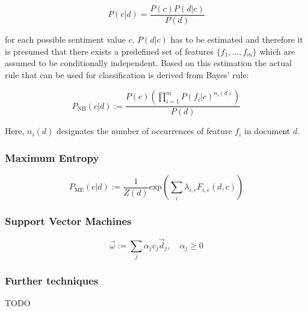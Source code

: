 \begin{equation*}
P(c \vert d) = \frac{P(c)P(d \vert c)}{P(d)}
\end{equation*}

for each possible sentiment value $c$. $P(d \vert c)$ has to be estimated and therefore it is presumed that there exists a predefined set of features $\lbrace f_1, \ldots , f_m \rbrace$ which are assumed to be conditionally independent. Based on this estimation the actual rule that can be used for classification is derived from Bayes' rule:

\begin{equation*}
P_{\mathrm{NB}}(c \vert d) := \frac{P(c)(\prod^{m}_{i=1}P(f_i \vert c)^{n_i(d)})}{P(d)}
\end{equation*}

Here, $n_i(d)$ designates the number of occurrences of feature $f_i$ in document $d$.

\subsubsection*{Maximum Entropy}

\begin{equation*}
P_{\mathrm{ME}}(c \vert d) := \frac{1}{Z(d)}\mathrm{exp}\left( \sum_{i} \lambda_{i,c} F_{i,c}(d,c) \right)
\end{equation*}

\subsubsection*{Support Vector Machines}

\begin{equation*}
\vec{\omega} := \sum_j \alpha_j c_j \vec{d}_j,\quad \alpha_j \geq 0
\end{equation*}

\subsubsection*{Further techniques}

TODO